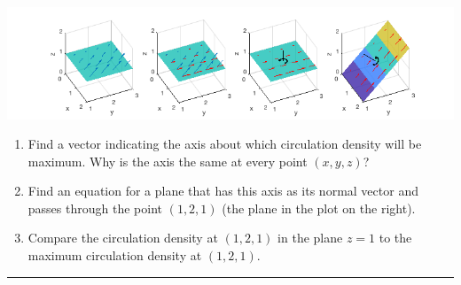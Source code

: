 \documentclass[12pt,letterpaper,noanswers]{exam}
\newcommand{\mb}[1]{\underline{#1}}
\begin{document}
\hspace{-1in}\includegraphics[width=1.2\linewidth]{img/C33p2-18.png}


\begin{enumerate}
\itemsep4em
    \item Find a vector indicating the axis about which circulation density will be maximum.  Why is the axis the same at every point $(x,y,z)$?

    \item Find an equation for a plane that has this axis as its normal vector and passes through the point $(1,2,1)$  (the plane in the plot on the right).
    \item Compare the circulation density at $(1,2,1)$ in the plane $z = 1$ to the maximum circulation density at $(1,2,1)$.
\end{enumerate}
\vspace{1in}



\vspace{0.2cm}
\hrule
\vspace{0.2cm}






\end{document}
